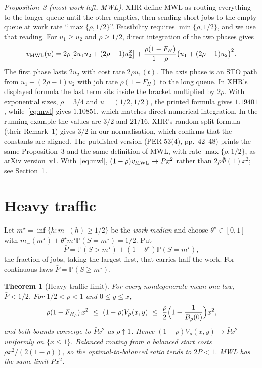 \documentclass[11pt]{article}
\numberwithin{equation}{section}
\newtheorem{theorem}{Theorem}
\theoremstyle{definition}
\theoremstyle{remark}
\newcommand{\Prob}{\mathbb{P}}
\begin{document}
\emph{Proposition~3 (most work left, MWL).} XHR define MWL as routing everything to the longer queue until the other empties, then sending short jobs to the empty queue at work rate ``$\max\{\rho,1/2\}$''. Feasibility requires $\min\{\rho,1/2\}$, and we use that reading. For $u_1\ge u_2$ and $\rho\ge1/2$, direct integration of the two phases gives
\begin{equation}\label{eq:mwl}
v_{\rm MWL}(u)=2\rho\bigl[2u_1u_2+(2\rho-1)u_2^2\bigr]+\frac{\rho(1-F_H)}{1-\rho}\bigl(u_1+(2\rho-1)u_2\bigr)^2 .
\end{equation}
The first phase lasts $2u_2$ with cost rate $2\rho u_1(t)$. The axis phase is an STO path from $u_1+(2\rho-1)u_2$ with job rate $\rho(1-F_H)$ to the long queue. In XHR's displayed formula the last term sits inside the bracket multiplied by $2\rho$. With exponential sizes, $\rho=3/4$ and $u=(1/2,1/2)$, the printed formula gives $1.19401$, while~\eqref{eq:mwl} gives $1.10851$, which matches direct numerical integration. In the running example the values are $3/2$ and $21/16$. XHR's random-split formula (their Remark~1) gives $3/2$ in our normalisation, which confirms that the constants are aligned. The published version (PER 53(4), pp.~42--48) prints the same Proposition~3 and the same definition of MWL, with rate $\max\{\rho,1/2\}$, as arXiv version~v1. With~\eqref{eq:mwl}, $(1-\rho)v_{\rm MWL}\to\bar P x^2$ rather than $2\rho\bar\Phi(1)x^2$; see Section~\ref{sec:ht}.

\section{Heavy traffic}\label{sec:ht}

Let $m^\star=\inf\{h:m_+(h)\ge1/2\}$ be the \emph{work median} and choose $\theta^\star\in[0,1]$ with $m_-(m^\star)+\theta^\star m^\star\Prob(S=m^\star)=1/2$. Put
\[
\bar P=\Prob(S>m^\star)+(1-\theta^\star)\Prob(S=m^\star),
\]
the fraction of jobs, taking the largest first, that carries half the work. For continuous laws $\bar P=\Prob(S\ge m^\star)$.

\begin{theorem}[Heavy-traffic limit]\label{thm:ht}
For every nondegenerate mean-one law, $\bar P<1/2$. For $1/2<\rho<1$ and $0\le y\le x$,
\begin{equation}\label{eq:htsandwich}
\rho(1-F_{H_\rho})\,x^2\ \le\ (1-\rho)V_\rho(x,y)\ \le\ \frac\rho2\Bigl(1-\frac1{B_\rho(0)}\Bigr)x^2,
\end{equation}
and both bounds converge to $\bar P x^2$ as $\rho\uparrow1$. Hence $(1-\rho)V_\rho(x,y)\to\bar Px^2$ uniformly on $\{x\le1\}$. Balanced routing from a balanced start costs $\rho x^2/(2(1-\rho))$, so the optimal-to-balanced ratio tends to $2\bar P<1$. MWL has the same limit $\bar Px^2$.
\end{theorem}
\end{document}
